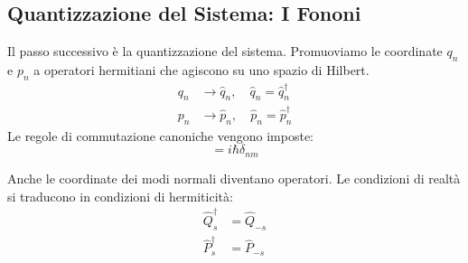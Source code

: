 \subsection{Quantizzazione del Sistema: I Fononi}

Il passo successivo è la quantizzazione  del sistema. Promuoviamo le coordinate $q_n$ e $p_n$ a operatori hermitiani che agiscono su uno spazio di Hilbert.
\begin{align}
    q_n &\rightarrow \hat{q}_n, \quad \hat{q}_n = \hat{q}_n^\dagger \\
    p_n &\rightarrow \hat{p}_n, \quad \hat{p}_n = \hat{p}_n^\dagger
\end{align}
Le regole di commutazione canoniche vengono imposte:
\begin{equation}
    [\hat{q}_n, \hat{p}_m] = i\hbar\delta_{nm}
\end{equation}

Anche le coordinate dei modi normali diventano operatori. Le condizioni di realtà si traducono in condizioni di hermiticità:
\begin{align}
    \hat{Q}_s^\dagger &= \hat{Q}_{-s} \\
    \hat{P}_s^\dagger &= \hat{P}_{-s}
\end{align}





